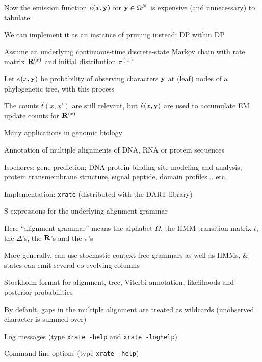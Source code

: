 \documentclass{beamer}
\begin{document}
\begin{frame}
\itemb
\item Now the emission function $e(x,{\bf y)}$ for ${\bf y} \in \Omega^N$ is expensive (and unnecessary) to tabulate
 \itemb
 \item We can implement it as an instance of pruning instead: DP within DP
 \item Assume an underlying continuous-time discrete-state Markov chain with rate matrix ${\bf R}^{(x)}$ and initial distribution $\pi^{(x)}$
 \item Let $e(x,{\bf y})$ be probability of observing characters ${\bf y}$ at (leaf) nodes of a phylogenetic tree, with this process
 \iteme
\item The counts $\hat{t}(x,x')$ are still relevant, but $\hat{e}(x,{\bf y})$ are used to accumulate EM update counts for ${\bf R}^{(x)}$
\iteme
\end{frame}

\begin{frame}{}
\itemb
\item Many applications in genomic biology
 \itemb
 \item Annotation of multiple alignments of DNA, RNA or protein sequences
 \item Isochores; gene prediction; DNA-protein binding site modeling and analysis; protein transmembrane structure, signal peptide, domain profiles... etc.
 \iteme
\iteme
\end{frame}{}

\begin{frame}
\itemb
\item Implementation: {\tt xrate} (distributed with the DART library)
 \itemb
 \item S-expressions for the underlying alignment grammar
  \itemb
  \item Here ``alignment grammar'' means the alphabet $\Omega$, the HMM transition matrix $t$, the $\Delta$'s, the ${\bf R}$'s and the $\pi$'s
  \item More generally, can use stochastic context-free grammars as well as HMMs, \& states can emit several co-evolving columns
  \iteme
 \item Stockholm format for alignment, tree, Viterbi annotation, likelihoods and posterior probabilities
 \item By default, gaps in the multiple alignment are treated as wildcards (unobserved character is summed over)
 \item Log messages (type {\tt xrate -help} and {\tt xrate -loghelp})
 \item Command-line options (type {\tt xrate -help})
 \iteme
\iteme

\end{frame}
\end{document}
